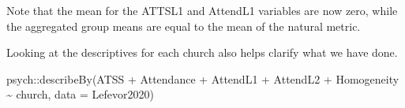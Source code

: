 \documentclass[
  11pt,
]{book}
\newenvironment{Shaded}{\begin{snugshade}}{\end{snugshade}}
\newcommand{\AttributeTok}[1]{\textcolor[rgb]{0.77,0.63,0.00}{#1}}
\newcommand{\FunctionTok}[1]{\textcolor[rgb]{0.00,0.00,0.00}{#1}}
\newcommand{\NormalTok}[1]{#1}
\newcommand{\SpecialCharTok}[1]{\textcolor[rgb]{0.00,0.00,0.00}{#1}}
\begin{document}
Note that the mean for the ATTSL1 and AttendL1 variables are now zero, while the aggregated group means are equal to the mean of the natural metric.

Looking at the descriptives for each church also helps clarify what we have done.

\begin{Shaded}
\begin{Highlighting}[]
\NormalTok{psych}\SpecialCharTok{::}\FunctionTok{describeBy}\NormalTok{(ATSS }\SpecialCharTok{+}\NormalTok{ Attendance }\SpecialCharTok{+}\NormalTok{ AttendL1 }\SpecialCharTok{+}\NormalTok{ AttendL2 }\SpecialCharTok{+}\NormalTok{ Homogeneity }\SpecialCharTok{\textasciitilde{}}\NormalTok{ church, }\AttributeTok{data =}\NormalTok{ Lefevor2020)}
\end{Highlighting}
\end{Shaded}
\end{document}
